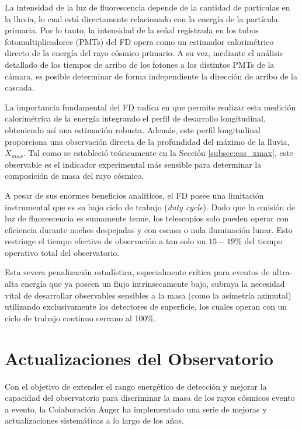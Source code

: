 La intensidad de la luz de fluorescencia depende de la cantidad de partículas en la lluvia, lo cual está directamente relacionado con la energía de la partícula primaria. Por lo tanto, la intensidad de la señal registrada en los tubos fotomultiplicadores (PMTs) del FD opera como un estimador calorimétrico directo de la energía del rayo cósmico primario. A su vez, mediante el análisis detallado de los tiempos de arribo de los fotones a los distintos PMTs de la cámara, es posible determinar de forma independiente la dirección de arribo de la cascada.

La importancia fundamental del FD radica en que permite realizar esta medición calorimétrica de la energía integrando el perfil de desarrollo longitudinal, obteniendo así una estimación robusta. Además, este perfil longitudinal proporciona una observación directa de la profundidad del máximo de la lluvia, $X_{max}$. Tal como se estableció teóricamente en la Sección \ref{subsec:eas_xmax}, este observable es el indicador experimental más sensible para determinar la composición de masa del rayo cósmico.

A pesar de sus enormes beneficios analíticos, el FD posee una limitación instrumental que es su bajo ciclo de trabajo (\textit{duty cycle}). Dado que la emisión de luz de fluorescencia es sumamente tenue, los telescopios solo pueden operar con eficiencia durante noches despejadas y con escasa o nula iluminación lunar. Esto restringe el tiempo efectivo de observación a tan solo un $15-19\%$ del tiempo operativo total del observatorio. 

Esta severa penalización estadística, especialmente crítica para eventos de ultra-alta energía que ya poseen un flujo intrínsecamente bajo, subraya la necesidad vital de desarrollar observables sensibles a la masa (como la asimetría azimutal) utilizando exclusivamente los detectores de superficie, los cuales operan con un ciclo de trabajo continuo cercano al 100\%.

\section{Actualizaciones del Observatorio}
\label{subsec:enhancements}

Con el objetivo de extender el rango energético de detección y mejorar la capacidad del observatorio para discriminar la masa de los rayos cósmicos evento a evento, la Colaboración Auger ha implementado una serie de mejoras y actualizaciones sistemáticas a lo largo de los años. 

